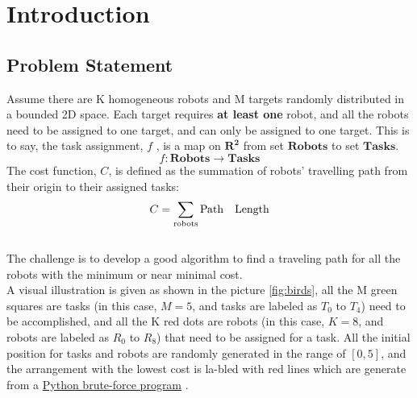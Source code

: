 \chapter{Introduction}

\section{Problem Statement}
Assume there are K homogeneous robots and M targets randomly distributed in a bounded 2D space. Each target requires \textbf{at least one} robot, and all the robots need to be assigned to one target, and can only be assigned to one target. This is to say, the task assignment, $f$ , is a map on $\mathbf{R^2}$ from set $\mathbf{Robots}$ to set $\mathbf{Tasks}$. 
\begin{equation}
    f:{\mathbf{Robots}} \to \mathbf{Tasks}
\end{equation}
The cost function, $C$, is defined as the summation of robots' travelling path from their origin to their assigned tasks:
\begin{equation}
   C = \sum\limits_{{\rm{robots}}} {{\rm{Path\quad } \rm{Length}}} 
\end{equation}
\\
The challenge is to develop a good algorithm to find a traveling path for all the robots with the minimum or near minimal cost.
\\
A visual illustration is given as shown in the picture \ref{fig:birds}, all the M green squares are tasks (in this case, $M=5$, and tasks are labeled as $T_0$ to $T_4$) need to be accomplished, and all the K red dots are robots (in this case, $K=8$, and robots are labeled as $R_0$ to $R_8$) that need to be assigned for a task. All the initial position for tasks and robots are randomly generated in the range of $[0,5]$, and the arrangement with the lowest cost is la-bled with red lines which are generate from a \href{https://github.com/ENGG6570/Group-Project/tree/main/ENGG6570_Project}{Python brute-force program}  . 

